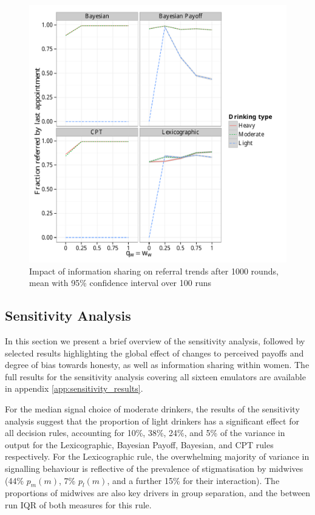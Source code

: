 \begin{figure}[H]
\begin{adjustbox}{center}
\includegraphics[width=119mm]{figures/ref_sharing}
\end{adjustbox}
\caption{Impact of information sharing on referral trends after 1000 rounds, mean with 95\% confidence interval over 100 runs}
\label{fig:ref_sharing}
\end{figure}


\subsection{Sensitivity Analysis}
\label{sub:sa_results}

In this section we present a brief overview of the sensitivity analysis, followed by selected results highlighting the global effect of changes to perceived payoffs and degree of bias towards honesty, as well as information sharing within women. The full results for the sensitivity analysis covering all sixteen emulators are available in appendix \ref{app:sensitivity_results}.

For the median signal choice of moderate drinkers, the results of the sensitivity analysis suggest that the proportion of light drinkers has a significant effect for all decision rules, accounting for 10\%, 38\%, 24\%, and 5\% of the variance in output for the Lexicographic, Bayesian Payoff, Bayesian, and \ac{CPT} rules respectively. For the Lexicographic rule, the overwhelming majority of variance in signalling behaviour is reflective of the prevalence of stigmatisation by midwives (44\% \(p_{m}(m)\), 7\% \(p_{l}(m)\), and a further 15\% for their interaction).  The proportions of midwives are also key drivers in group separation, and the between run IQR of both measures for this rule. 

